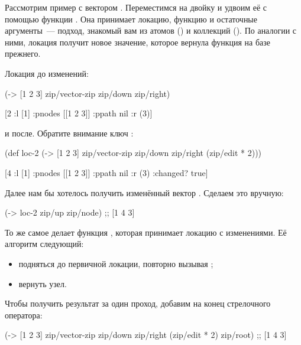 Рассмотрим пример с вектором \code{[1 2 3]}. Переместимся на двойку и удвоим её с
помощью функции . Она принимает локацию, функцию и остаточные
аргументы~--- подход, знакомый вам из атомов () и коллекций (). По
аналогии с ними, локация получит новое значение, которое вернула функция на базе
прежнего.

Локация до изменений:

\begin{english}
  \begin{clojure}
(-> [1 2 3]
    zip/vector-zip
    zip/down
    zip/right)

[2 {:l [1] :pnodes [[1 2 3]] :ppath nil :r (3)}]
  \end{clojure}
\end{english}

и после. Обратите внимание ключ :

\begin{english}
  \begin{clojure}
(def loc-2
  (-> [1 2 3]
      zip/vector-zip
      zip/down
      zip/right
      (zip/edit * 2)))

[4 {:l [1] :pnodes [[1 2 3]] :ppath nil :r (3)
    :changed? true}]
  \end{clojure}
\end{english}

Далее нам бы хотелось получить изменённый вектор \code{[1 4 3]}. Сделаем это вручную:

\begin{english}
  \begin{clojure}
(-> loc-2
    zip/up
    zip/node)
;; [1 4 3]
  \end{clojure}
\end{english}

То же самое делает функция , которая принимает локацию с
изменениями. Её алгоритм следующий:

\begin{itemize}

\item
  подняться до первичной локации, повторно вызывая ;

\item
  вернуть узел.

\end{itemize}

Чтобы получить результат за один проход, добавим  на конец стрелочного
оператора:

\begin{english}
  \begin{clojure}
(-> [1 2 3]
    zip/vector-zip
    zip/down
    zip/right
    (zip/edit * 2)
    zip/root)
;; [1 4 3]
  \end{clojure}
\end{english}

